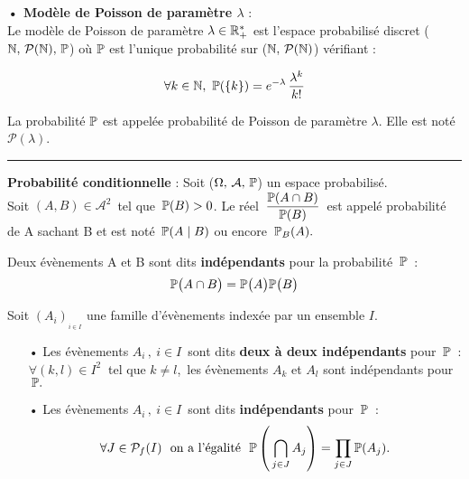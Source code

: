 \vspace{0.9cm}

\textbf{• Modèle de Poisson de paramètre $\lambda$} :\vspace{0.2cm}\\
Le modèle de Poisson de paramètre \(\lambda\in\mathbb{R}^*_+\) est l'espace probabilisé discret (\(\mathbb{N},\,\mathcal{P}(\mathbb{N}),\,\mathbb{P}\)) où \(\mathbb{P}\) est l'unique probabilité sur (\(\mathbb{N},\,\mathcal{P}(\mathbb{N})\)) vérifiant :\vspace{-0.3cm}

\[\forall k\in \NN,\ \PP(\{k\})=e^{-\lambda}\,\frac{\lambda^k}{k!}\]

\vspace{0.4cm}

\noindent La probabilité \(\mathbb{P}\) est appelée probabilité de Poisson de paramètre $\lambda$. Elle est noté \(\mathcal{P}(\lambda)\).

\vspace{0.9cm}

\hrule

\vspace{1cm}

\noindent \textbf{Probabilité conditionnelle} : Soit (\(\Omega,\,\mathcal{A},\,\mathbb{P}\)) un espace probabilisé.\vspace{0.1cm}\\
Soit \((A,B)\in\mathcal{A}^2\,\) tel que \(\,\mathbb{P}(B)>0\). Le réel \(\displaystyle \, \frac{\mathbb{P}(A\cap B)}{\mathbb{P}(B)}\,\) est appelé probabilité de A sachant B et est noté \(\,\mathbb{P}(A\mid B)\) ou encore \(\,\mathbb{P}_B(A).\)

\vspace{1.5cm}

Deux évènements A et B sont dits \textbf{indépendants} pour la probabilité \(\,\mathbb{P}\,\) \ssi :\vspace{-0.2cm}
\[\mathbb{P}\bigl(A\cap B\bigr)=\mathbb{P}\bigl(A\bigr)\mathbb{P}\bigl(B\bigr)\]

\vspace{0.4cm}

\noindent Soit \((A_i)_{_{i\in I}}\) une famille d'évènements indexée par un ensemble $I$.
\begin{itemize}
    \item[•] Les évènements \(A_i\,,\: i\in I\,\) sont dits \textbf{deux à deux indépendants} pour \(\,\mathbb{P}\,\) \ssi : \(\forall (k,l)\in I^2\:\) tel que \(k\neq l\),\, les évènements \(A_k\) et \(A_l\) sont indépendants pour \(\,\mathbb{P}.\)\vspace{0.2cm}
    
    \item[•] Les évènements \(A_i\,,\: i\in I\,\) sont dits \textbf{indépendants} pour \(\,\mathbb{P}\,\) \ssi :\vspace{-0.4cm}\\
    \[\forall J\in \mathcal{P}_f(I)\ \text{ on a l'égalité }\ \mathbb{P}\left(\,\bigcap _{j\in J}A_j\right)=\prod_{j\in J}\mathbb{P}(A_j). \]
\end{itemize}

